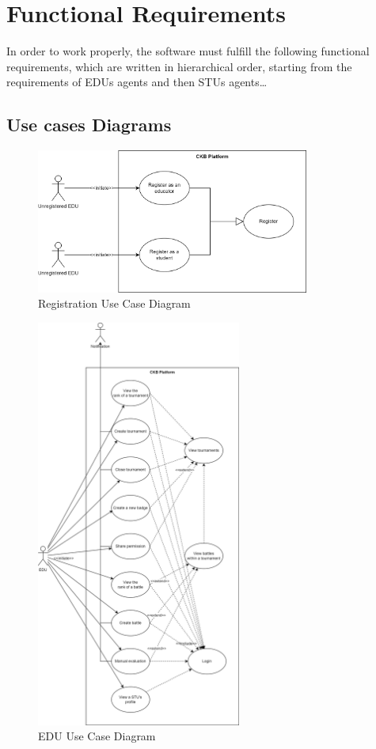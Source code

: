 \section{Functional Requirements}
In order to work properly, the software must fulfill the following functional requirements, which are written in hierarchical order, starting from the requirements of EDUs agents and then STUs agents\dots

\subsection{Use cases Diagrams}

\begin{figure}[H]
    \centering
    \includegraphics[width=0.8\textwidth]{images/sequence_diagrams/use_case_diagrams_registration.png}
    \caption{Registration Use Case Diagram}
\end{figure}
\begin{figure}[H]
    \centering
    \includegraphics[width=0.6\textwidth]{images/sequence_diagrams/use_case_diagrams_EDU.png}
    \caption{EDU Use Case Diagram}
\end{figure}
